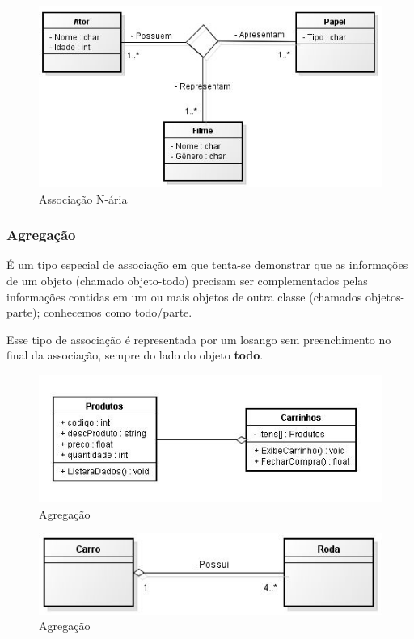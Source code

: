 \begin{figure}[H]
	\centering
	\includegraphics[scale=0.8]{imagens/associacao-ternaria.jpg}
	\caption{Associação N-ária}
	\label{fig:ass-enaria}
\end{figure}

\subsubsection{Agregação}

É um tipo especial de associação em que tenta-se demonstrar que as informações de um objeto (chamado objeto-todo) precisam ser complementados pelas informações contidas em um ou mais objetos de outra classe (chamados objetos-parte); conhecemos como todo/parte.

Esse tipo de associação é representada por um losango sem preenchimento no final da associação, sempre do lado do objeto \textbf{todo}.

\begin{figure}[H]
	\centering
	\includegraphics[scale=0.8]{imagens/agregacao2.jpg}
	\caption{Agregação}
	\label{fig:agregacao}
\end{figure}

\begin{figure}[H]
	\centering
	\includegraphics[scale=0.8]{imagens/7.JPG}
	\caption{Agregação}
	\label{fig:agregacao2}
\end{figure}

